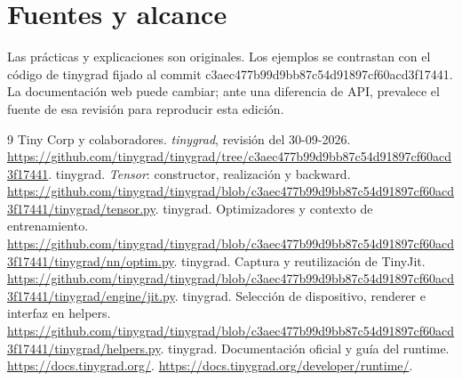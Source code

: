\chapter{Fuentes y alcance}
Las prácticas y explicaciones son originales. Los ejemplos se contrastan con el código de tinygrad fijado al commit c3aec477b99d9bb87c54d91897cf60acd3f17441. La documentación web puede cambiar; ante una diferencia de API, prevalece el fuente de esa revisión para reproducir esta edición.

\begin{thebibliography}{9}
 Tiny Corp y colaboradores. \emph{tinygrad}, revisión del 30-09-2026. \url{https://github.com/tinygrad/tinygrad/tree/c3aec477b99d9bb87c54d91897cf60acd3f17441}.
 tinygrad. \emph{Tensor}: constructor, realización y backward. \url{https://github.com/tinygrad/tinygrad/blob/c3aec477b99d9bb87c54d91897cf60acd3f17441/tinygrad/tensor.py}.
 tinygrad. Optimizadores y contexto de entrenamiento. \url{https://github.com/tinygrad/tinygrad/blob/c3aec477b99d9bb87c54d91897cf60acd3f17441/tinygrad/nn/optim.py}.
 tinygrad. Captura y reutilización de TinyJit. \url{https://github.com/tinygrad/tinygrad/blob/c3aec477b99d9bb87c54d91897cf60acd3f17441/tinygrad/engine/jit.py}.
 tinygrad. Selección de dispositivo, renderer e interfaz en helpers. \url{https://github.com/tinygrad/tinygrad/blob/c3aec477b99d9bb87c54d91897cf60acd3f17441/tinygrad/helpers.py}.
 tinygrad. Documentación oficial y guía del runtime. \url{https://docs.tinygrad.org/}. \url{https://docs.tinygrad.org/developer/runtime/}.
\end{thebibliography}
